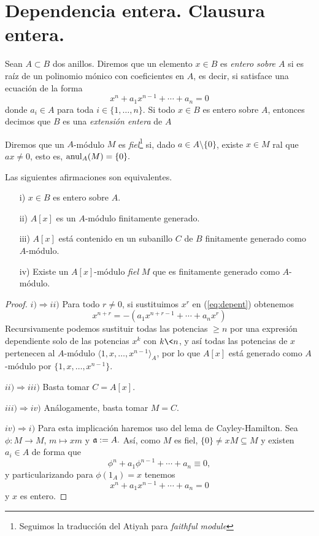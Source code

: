 \documentclass[../main.tex]{subfiles}
\begin{document}
\section{Dependencia entera. Clausura entera.}
\begin{definition}
Sean $A\subset B$ dos anillos. Diremos que un elemento $x\in B$ es \textit{entero sobre $A$} si es raíz de un polinomio mónico con coeficientes en $A$, es decir, si satisface una ecuación de la forma
\begin{equation}\label{eq:depent}
    x^n+a_1x^{n-1}+\cdots+a_n=0
\end{equation}
donde $a_i\in A$ para toda $i\in\{1,\dots,n\}.$ Si todo $x\in B$ es entero sobre $A$, entonces decimos que $B$ es una \textit{extensión entera} de $A$
\end{definition}

\begin{definition}Diremos que un $A$-módulo $M$ es \textit{fiel}\footnote{Seguimos la traducción del Atiyah para \emph{faithful module}} si, dado $a\in A\setminus\{0\}$, existe $x\in M$ ral que $ax\neq 0$, esto es, $\operatorname{anul}_A(M)=\{0\}.$
\end{definition}

\begin{proposition}\label{prop:entcarac}Las siguientes afirmaciones son equivalentes.
\begin{itemize}
    \item[i)] $x\in B$ es entero sobre $A.$
    \item[ii)] $A[x]$ es un $A$-módulo finitamente generado.
    \item[iii)] $A[x]$ está contenido en un subanillo $C$ de $B$ finitamente generado como $A$-módulo.
    \item[iv)] Existe un $A[x]$-módulo \emph{fiel} $M$ que es finitamente generado como $A$-módulo.
\end{itemize}
\end{proposition}
\begin{proof}
$i)\Rightarrow ii)$ Para todo $r\neq0$, si sustituimos $x^r$  en (\ref{eq:depent}) obtenemos
$$x^{n+r}=-(a_1x^{n+r-1}+\cdots+a_nx^r)$$
Recursivamente podemos sustituir todas las potencias $\geq n$ por una expresión dependiente solo de las potencias $x^k$ con $k\<n$, y así todas las potencias de $x$ pertenecen al $A$-módulo $\langle 1,x,\dots,x^{n-1}\rangle_A$, por lo que $A[x]$ está generado como $A$-módulo por $\{1,x,\dots,x^{n-1}\}.$

$ii)\Rightarrow iii)$ Basta tomar $C=A[x].$

$iii)\Rightarrow iv)$ Análogamente, basta tomar $M=C.$

$iv)\Rightarrow i)$ Para esta implicación haremos uso del lema de Cayley-Hamilton. Sea $\phi:M\rightarrow M$, $m\mapsto xm$ y $\mathfrak{a}:= A.$ Así, como $M$ es fiel, $\{0\}\neq xM\subseteq M$ y existen $a_i\in A$ de forma que
$$\phi^n+a_1\phi^{n-1}+\cdots+a_n\equiv 0,$$
y particularizando para $\phi(1_A) = x$ tenemos
$$x^n+a_1x^{n-1}+\cdots+a_n= 0$$
y $x$ es entero.
\end{proof}
\end{document}
